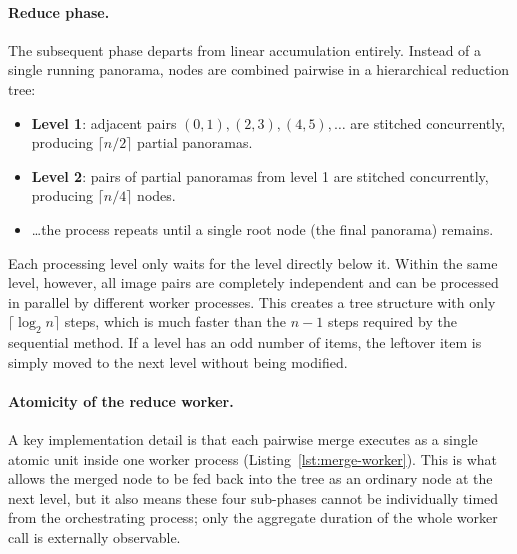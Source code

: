 \documentclass[10pt,twocolumn,letterpaper]{article}
\begin{document}
\paragraph{Reduce phase.}
The subsequent phase departs from linear accumulation entirely. Instead of a single running
panorama, nodes are combined pairwise in a hierarchical reduction tree:

\begin{itemize}
    \item \textbf{Level 1}: adjacent pairs $(0,1), (2,3), (4,5), \ldots$ are stitched
    concurrently, producing $\lceil n/2 \rceil$ partial panoramas.
    \item \textbf{Level 2}: pairs of partial panoramas from level 1 are stitched concurrently,
    producing $\lceil n/4 \rceil$ nodes.
    \item[] \ldots the process repeats until a single root node (the final panorama)
    remains.
\end{itemize}

Each processing level only waits for the level directly 
below it. Within the same level, however, all image pairs are 
completely independent and can be processed in parallel by different 
worker processes. This creates a tree structure with only 
$\lceil \log_2 n \rceil$ steps, which is much faster than the $n-1$ 
steps required by the sequential method. If a level has an odd 
number of items, the leftover item is simply moved to the next level 
without being modified.

\paragraph{Atomicity of the reduce worker.}
A key implementation detail is that each pairwise merge executes as a single atomic unit inside one worker
process (Listing~\ref{lst:merge-worker}). This is what allows the merged node to be fed
back into the tree as an ordinary node at the next level, but it also means these four
sub-phases cannot be individually timed from the orchestrating process; only the aggregate
duration of the whole worker call is externally observable.
\end{document}
